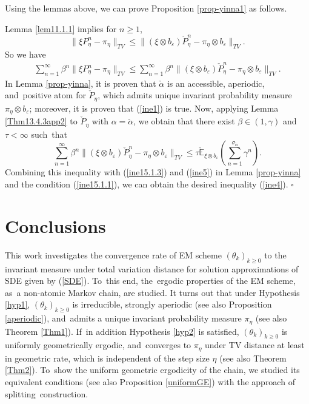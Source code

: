 \documentclass[11pt]{elsarticle}
\def\geq{\geqslant}
\def\leq{\leqslant}
\def\E{\mathbb{E}}
\begin{document}
Using the lemmas above, we can prove Proposition \ref{prop-yinna1} as follows.
\begin{pot3}
	Lemma \ref{lem11.1.1} implies for $n\geq1$,
	$$\|\xi P_\eta^n-\pi_\eta\|_{TV}\leq\|(\xi\otimes b_\varepsilon)\check{P}_\eta^n-\pi_\eta\otimes b_\varepsilon\|_{TV}.$$
	So we have
	\begin{align}\label{ine5}
		\sum_{n=1}^\infty\beta^n\|\xi P_\eta^n-\pi_\eta\|_{TV}\leq\sum_{n=1}^\infty\beta^n\|(\xi\otimes b_\varepsilon)\check{P}_\eta^n-\pi_\eta\otimes b_\varepsilon\|_{TV}.
	\end{align}
	In Lemma \ref{prop-yinna}, it is proven that $\check{\alpha}$ is an accessible, aperiodic, and~positive atom for $\check{P}_\eta$, which admits unique invariant probability measure $\pi_\eta\otimes b_\varepsilon$; moreover, it is proven that (\ref{ine1}) is true. Now, applying Lemma \ref{Thm13.4.3app2} to $\check{P}_\eta$ with $\alpha=\check{\alpha}$, we obtain that there exist $\beta\in(1,\gamma)$ and $\tau<\infty$ such~that
	$$	\sum_{n=1}^\infty\beta^n\|(\xi\otimes b_\varepsilon)\check{P}_\eta^n-\pi_\eta\otimes b_\varepsilon\|_{TV}\leq\tau\check{\E}_{\xi\otimes b_\varepsilon}\left(\sum_{n=1}^{\sigma_{\check{\alpha}}}\gamma^n\right).$$
	Combining this inequality with (\ref{ine15.1.3}) and (\ref{ine5}) in Lemma \ref{prop-yinna} and the condition (\ref{ine15.1.1}), we can obtain the desired inequality (\ref{ine4}). \hfill$\square$
\end{pot3}
\section{Conclusions}\label{sec5}
This work investigates the convergence rate of EM scheme $(\theta_k)_{k\geq0}$ to the invariant measure under total variation distance for solution approximations of SDE given by (\ref{SDE}). To~this end, the~ergodic properties of the EM scheme, as~a non-atomic Markov chain, are studied. It turns out that under Hypothesis \ref{hyp1}, $(\theta_k)_{k\geq0}$ is irreducible, strongly aperiodic (see also Proposition \ref{aperiodic}), and~admits a unique invariant probability measure $\pi_\eta$ (see also Theorem \ref{Thm1}). If~in addition Hypothesis \ref{hyp2} is satisfied, $(\theta_k)_{k\geq0}$ is uniformly geometrically ergodic, and~converges to $\pi_\eta$ under TV distance at least in geometric rate, which is independent of the step size $\eta$ (see also Theorem \ref{Thm2}). To~show the uniform geometric ergodicity of the chain, we studied its equivalent conditions (see also Proposition \ref{uniformGE}) with the approach of splitting~construction.
\end{document}
